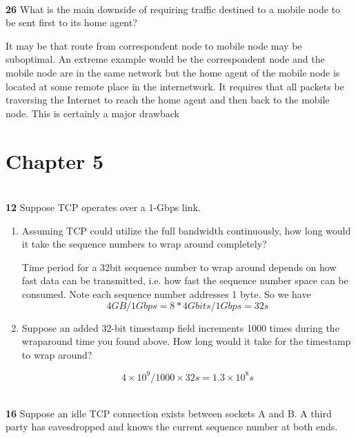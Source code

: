 \documentclass[11pt]{article}
\begin{document}
$ $\\
\textbf{26} What is the main downside of requiring traffic destined to a mobile node to be sent first to its home agent?

\begin{solution}
    It may be that route from correspondent node to mobile node may be suboptimal. An extreme example would be the correspondent node and the mobile node are in the same network but the home agent of the mobile node is located at some remote place in the internetwork. It requires that all packets be traversing the Internet to reach the home agent and then back to the mobile node. This is certainly a major drawback
\end{solution}



\section*{Chapter 5}

$ $\\
\textbf{12} Suppose TCP operates over a 1-Gbps link.

\begin{enumerate}
    \item Assuming TCP could utilize the full bandwidth continuously, how long would it take the sequence numbers to wrap around completely?
    \begin{solution}
        Time period for a 32bit sequence number to wrap around depends on how fast data can be transmitted, i.e. how fast the sequence number space can be consumed. Note each sequence number addresses 1 byte. So we have 
        \[
            4GB / 1Gbps = 8 * 4Gbits / 1Gbps = 32 s
        \]
    \end{solution}
    \item Suppose an added 32-bit timestamp field increments 1000 times during the wraparound time you found above. How long would it take for the timestamp to wrap around?
    \begin{solution}
        \[
            4 \times 10^9 / 1000 \times 32s = 1.3 \times 10^8 s
        \]
    \end{solution}
\end{enumerate}


$ $\\
\textbf{16} Suppose an idle TCP connection exists between sockets A and B. A third party has eavesdropped and knows the current sequence number at both ends.
\end{document}
